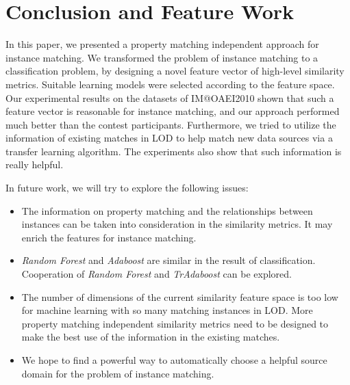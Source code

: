 \section{Conclusion and Feature Work}
\label{sec:conclusion}

In this paper, we presented a property matching independent approach for instance matching. We transformed the problem of instance matching to a classification problem, by designing a novel feature vector of high-level similarity metrics. Suitable learning models were selected according to the feature space. Our experimental results on the datasets of IM@OAEI2010 shown that such a feature vector is reasonable for instance matching, and our approach performed much better than the contest participants. Furthermore, we tried to utilize the information of existing matches in LOD to help match new data sources via a transfer learning algorithm. The experiments also show that such information is really helpful.

In future work, we will try to explore the following issues:
\begin{itemize}
\item The information on property matching and the relationships between instances can be taken into consideration in the similarity metrics. It may enrich the features for instance matching.
\item \textit{Random Forest} and \textit{Adaboost} are similar in the result of classification\cite{breiman2001random}. Cooperation of \textit{Random Forest} and \textit{TrAdaboost} can be explored.
\item The number of dimensions of the current similarity feature space is too low for machine learning with so many matching instances in LOD. More property matching independent similarity metrics need to be designed to make the best use of the information in the existing matches.
\item We hope to find a powerful way to automatically choose a helpful source domain for the problem of instance matching.
\end{itemize} 